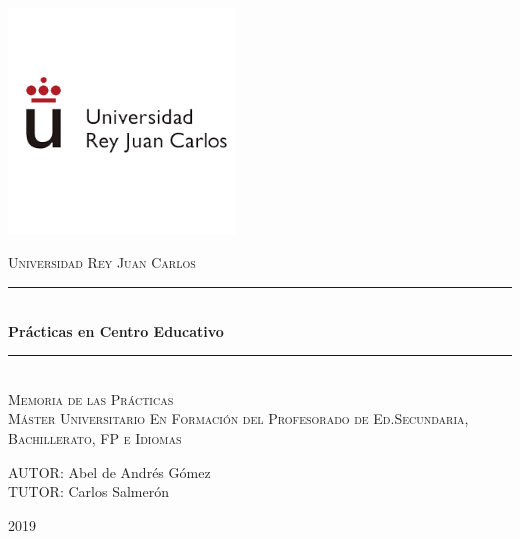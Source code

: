 \documentclass[spanish,12pt, a4paper,twoside]{paper}
\begin{document}
\begin{titlepage}

\newcommand{\HRule}{\rule{\linewidth}{0.5mm}} %

\renewcommand{\baselinestretch}{1.5}


 
  \hspace{9cm}
\includegraphics[width=6cm]{recursos/Logo_URJC.png}
\\[0cm]

\center %

\textsc{\large Universidad Rey Juan Carlos }
\\[3cm]


 \HRule \\[0.4cm]
{ \huge \bfseries Prácticas en Centro Educativo}\\[0.4cm] %
\HRule \\[2.5cm]

\textsc{\LARGE Memoria de las Prácticas}\\[0.5cm] 
\textsc{\Large Máster Universitario En Formación del Profesorado de Ed.Secundaria, Bachillerato, FP e Idiomas }\\[2.5cm]

\begin{flushright}
\large
AUTOR: Abel de Andrés Gómez\\
TUTOR: Carlos Salmerón\linebreak
\end{flushright}

\vspace{1.3cm}

{ {2019}}\\[3cm]

\vfill %

\end{titlepage}
\end{document}
